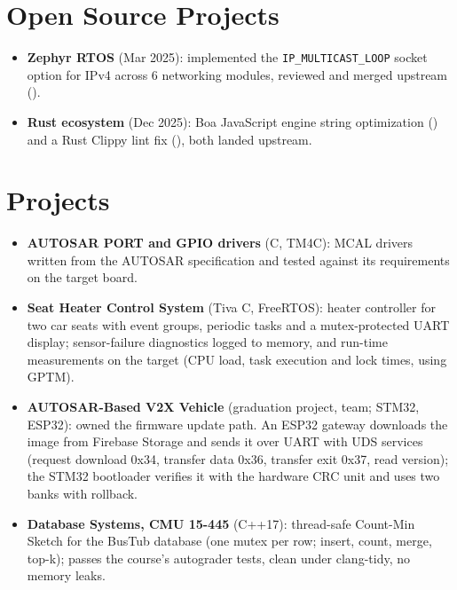 \documentclass[10pt]{article}
\begin{document}
\section*{Open Source Projects}
\begin{itemize}
  \item \textbf{Zephyr RTOS} (Mar 2025): implemented the \texttt{IP\_MULTICAST\_LOOP} socket option for IPv4 across 6 networking modules, reviewed and merged upstream ().
  \item \textbf{Rust ecosystem} (Dec 2025): Boa JavaScript engine string optimization () and a Rust Clippy lint fix (), both landed upstream.
\end{itemize}

\section*{Projects}
\begin{itemize}
  \item \textbf{AUTOSAR PORT and GPIO drivers} (C, TM4C): MCAL drivers written from the AUTOSAR specification and tested against its requirements on the target board.
  \item \textbf{Seat Heater Control System} (Tiva C, FreeRTOS): heater controller for two car seats with event groups, periodic tasks and a mutex-protected UART display; sensor-failure diagnostics logged to memory, and run-time measurements on the target (CPU load, task execution and lock times, using GPTM). 
  \item \textbf{AUTOSAR-Based V2X Vehicle} (graduation project, team; STM32, ESP32): owned the firmware update path. An ESP32 gateway downloads the image from Firebase Storage and sends it over UART with UDS services (request download 0x34, transfer data 0x36, transfer exit 0x37, read version); the STM32 bootloader verifies it with the hardware CRC unit and uses two banks with rollback. 
  \item \textbf{Database Systems, CMU 15-445} (C++17): thread-safe Count-Min Sketch for the BusTub database (one mutex per row; insert, count, merge, top-k); passes the course's autograder tests, clean under clang-tidy, no memory leaks. 
\end{itemize}
\end{document}
